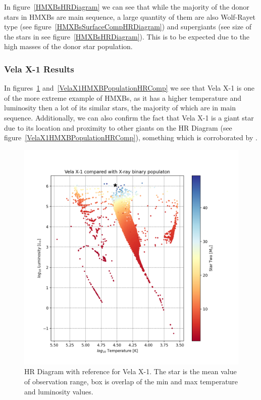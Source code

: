 \documentclass[12pt, a4paper]{article}
\begin{document}
        In figure~\ref{HMXBsHRDiagram} we can see that while the majority of the donor stars in HMXBs are main sequence, a large quantity of them are also Wolf-Rayet type (see figure~\ref{HMXBsSurfaceCompHRDiagram}) and supergiants (see size of the stars in see figure~\ref{HMXBsHRDiagram}). This is to be expected due to the high masses of the donor star population.  

            \subsubsection{Vela X-1 Results} \label{VelaX1Results}

            In figures~\ref{VelaX1XrBPopulationHRComp} and~\ref{VelaX1HMXBPopulationHRComp} we see that Vela X-1 is one of the more extreme example of HMXBs, as it has a higher temperature and luminosity then a lot of its similar stars, the majority of which are in main sequence. Additionally, we can also confirm the fact that Vela X-1 is a giant star due to its location and proximity to other giants on the HR Diagram (see figure~\ref{VelaX1HMXBPopulationHRComp}), something which is corroborated by \parencite{Kretschmar_2021}.

            \begin{figure}[H] 
                \centering
                \includegraphics[width=.9\textwidth]{figs/GeneratedFigs/VelaX-1/VelaX1XrBPopulationHRComp.png}
                \caption{HR Diagram with reference for Vela X-1. The star is the mean value of observation range, box is overlap of the min and max temperature and luminosity values.}
                \label{VelaX1XrBPopulationHRComp}
            \end{figure}
\end{document}
